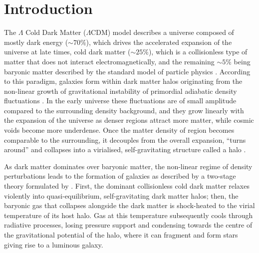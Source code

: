 \chapter{Introduction}
\label{chap:introduction}




The $\Lambda$ Cold Dark Matter ($\Lambda$CDM) model describes a universe composed of mostly dark energy ($\sim 70\%$), which drives the accelerated expansion
of the universe at late times, cold dark matter ($\sim 25\%$), which is a collisionless type of matter that does not interact 
electromagnetically, and the remaining $\sim 5\%$ being baryonic matter described by the standard model of particle physics 
\citep{PlanckCollaboration2016}. According to this paradigm, galaxies form within dark matter halos originating 
from the non-linear growth of gravitational instability of primordial adiabatic density fluctuations \citep{Peebles1965,Silk1968}.
In the early universe these fluctuations are of small amplitude compared to the surrounding density background, 
and they grow linearly with the expansion of the universe as denser regions attract more matter, while cosmic voids become more underdense. 
Once the matter density of region becomes comparable to the surrounding, it decouples from the overall expansion, ``turns around'' 
and collapses into a virialised, self-gravitating structure called a halo \citep{Press1974}. 
 
As dark matter dominates over baryonic matter, the non-linear regime of density perturbations leads to the formation
of galaxies as described by a two-stage theory formulated by \citet{White1978}.
First, the dominant collisionless cold dark matter relaxes violently into quasi-equilibrium, self-gravitating dark
matter halos; then, the baryonic gas that collapses alongside the dark matter is shock-heated to the virial temperature
of its host halo. Gas at this temperature subsequently cools through radiative processes, losing pressure support and
condensing towards the centre of the gravitational potential of the halo, where it can fragment and form stars
giving rise to a luminous galaxy.

